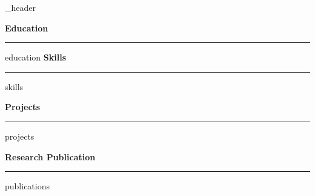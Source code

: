 \documentclass[letterpaper,11pt]{article}
\author{\textbf{Youzhi Wang} } %
\begin{document}
{_header}



\textbf{\Large Education} 
\vspace{3pt}
\hrule
\vspace{3pt}
{education}
\vspace*{7pt}
\textbf{\Large Skills} 
\vspace{1pt}

\hrule

{skills}
\vspace*{7pt}

    \textbf{\Large Projects}

\hrule

\vspace*{3pt}
{projects}
\vspace*{5pt}



\textbf{\Large Research Publication} 
\vspace{3pt}
\hrule
\vspace{3pt}
{publications}
\vspace*{7pt}

\end{document}
